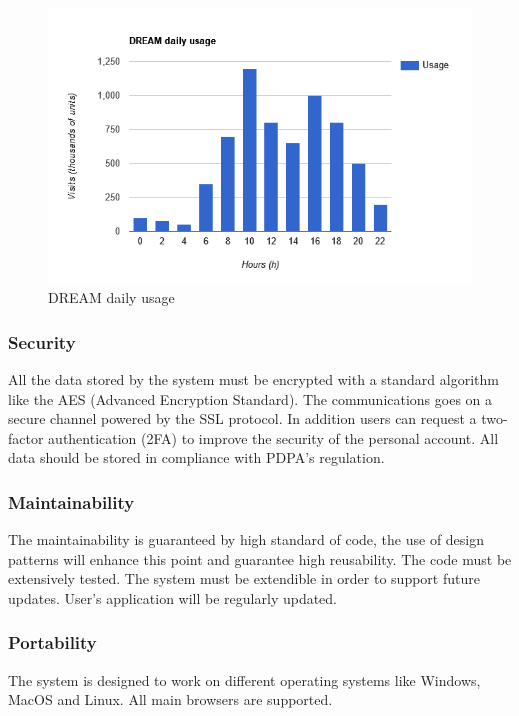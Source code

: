 \documentclass[table, 12pt]{article}
\begin{document}
\begin{center}
    \begin{figure}[!h]
        \includegraphics[scale=0.60, center]{assets/bar-graph-daily-usage.png}
        \caption{DREAM daily usage}
        \label{fig: daily_usage}
    \end{figure}
\end{center}

\subsubsection{Security}
All the data stored by the system must be encrypted with a standard algorithm like the AES (Advanced Encryption Standard).
The communications goes on a secure channel powered by the SSL protocol.
In addition users can request a two-factor authentication (2FA) to improve the security of the personal account.
All data should be stored in compliance with PDPA's regulation.
\subsubsection{Maintainability}
The maintainability is guaranteed by high standard of code, the use of design patterns will enhance this point and guarantee high reusability.
The code must be extensively tested.
The system must be extendible in order to support future updates.
User's application will be regularly updated.
\subsubsection{Portability}
The system is designed to work on different operating systems like Windows, MacOS and Linux.
All main browsers are supported.
\end{document}
